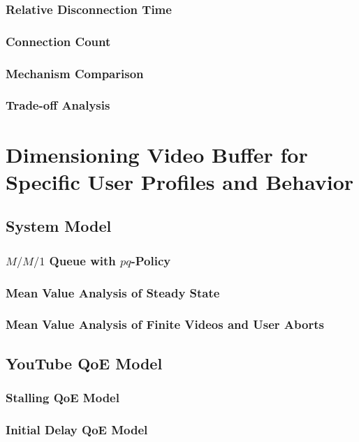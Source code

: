 \subsubsection*{Relative Disconnection Time}
\subsubsection*{Connection Count}
\subsubsection*{Mechanism Comparison}
\subsubsection*{Trade-off Analysis}

\section{Dimensioning Video Buffer for Specific User Profiles and Behavior}
\cite{Hossfeld2015}

\subsection{System Model}
\subsubsection*{$M/M/1$ Queue with $pq$-Policy}
\subsubsection*{Mean Value Analysis of Steady State}
\subsubsection*{Mean Value Analysis of Finite Videos and User Aborts}

\subsection{YouTube QoE Model}
\subsubsection*{Stalling QoE Model}
\subsubsection*{Initial Delay QoE Model}
